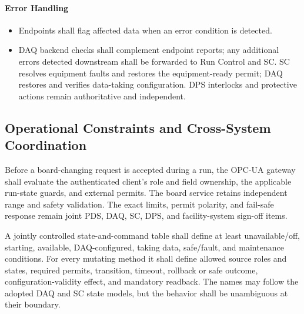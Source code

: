 \paragraph{Error Handling}
\begin{itemize}[nosep]
  \item Endpoints shall flag affected data when an error condition is detected.

  \item DAQ backend checks shall complement endpoint reports; any additional errors detected downstream shall be forwarded to Run Control and SC. SC resolves equipment faults and restores the equipment-ready permit; DAQ restores and verifies data-taking configuration. DPS interlocks and protective actions remain authoritative and independent.
\end{itemize}

\subsection{Operational Constraints and Cross-System Coordination}

Before a board-changing request is accepted during a run, the OPC-UA gateway shall evaluate the authenticated client's role and field ownership, the applicable run-state guards, and external permits. The board service retains independent range and safety validation. The exact limits, permit polarity, and fail-safe response remain joint PDS, DAQ, SC, DPS, and facility-system sign-off items.

A jointly controlled state-and-command table shall define at least unavailable/off,
starting, available, DAQ-configured, taking data, safe/fault, and maintenance conditions.
For every mutating method it shall define allowed source roles and states, required permits,
transition, timeout, rollback or safe outcome, configuration-validity effect, and mandatory
readback. The names may follow the adopted DAQ and SC state models, but the behavior shall
be unambiguous at their boundary.

